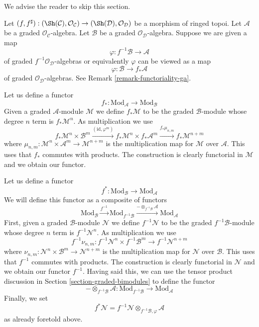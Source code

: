 \noindent
We advise the reader to skip this section.

\medskip\noindent
Let $(f, f^\sharp) : (\Sh(\mathcal{C}), \mathcal{O}_\mathcal{C})
\to (\Sh(\mathcal{D}), \mathcal{O}_\mathcal{D})$
be a morphism of ringed topoi. Let $\mathcal{A}$ be a
graded $\mathcal{O}_\mathcal{C}$-algebra. Let $\mathcal{B}$ be a
graded $\mathcal{O}_\mathcal{D}$-algebra.
Suppose we are given a map
$$
\varphi : f^{-1}\mathcal{B} \to \mathcal{A}
$$
of graded $f^{-1}\mathcal{O}_\mathcal{D}$-algebras or equivalently
$\varphi$ can be viewed as a map
$$
\varphi : \mathcal{B} \to f_*\mathcal{A}
$$
of graded $\mathcal{O}_\mathcal{D}$-algebras.
See Remark \ref{remark-functoriality-ga}.

\medskip\noindent
Let us define a functor
$$
f_* :
\text{Mod}_\mathcal{A}
\longrightarrow
\text{Mod}_\mathcal{B}
$$
Given a graded $\mathcal{A}$-module $\mathcal{M}$ we define
$f_*\mathcal{M}$ to be the graded $\mathcal{B}$-module
whose degree $n$ term is $f_*\mathcal{M}^n$. As multiplication
we use
$$
f_*\mathcal{M}^n \times \mathcal{B}^m
\xrightarrow{(\text{id}, \varphi^m)}
f_*\mathcal{M}^n \times f_*\mathcal{A}^m
\xrightarrow{f_*\mu_{n, m}}
f_*\mathcal{M}^{n + m}
$$
where $\mu_{n, m} : \mathcal{M}^n \times \mathcal{A}^m
\to \mathcal{M}^{n + m}$ is the multiplication map for $\mathcal{M}$
over $\mathcal{A}$. This uses that $f_*$ commutes with products.
The construction is clearly functorial in
$\mathcal{M}$ and we obtain our functor.

\medskip\noindent
Let us define a functor
$$
f^* :
\text{Mod}_\mathcal{B}
\longrightarrow
\text{Mod}_\mathcal{A}
$$
We will define this functor as a composite of functors
$$
\text{Mod}_\mathcal{B}
\xrightarrow{f^{-1}}
\text{Mod}_{f^{-1}\mathcal{B}}
\xrightarrow{ - \otimes_{f^{-1}\mathcal{B}} \mathcal{A}}
\text{Mod}_\mathcal{A}
$$
First, given a graded $\mathcal{B}$-module $\mathcal{N}$ we define
$f^{-1}\mathcal{N}$ to be the graded $f^{-1}\mathcal{B}$-module
whose degree $n$ term is $f^{-1}\mathcal{N}^n$. As multiplication
we use
$$
f^{-1}\nu_{n, m} :
f^{-1}\mathcal{N}^n \times f^{-1}\mathcal{B}^m
\longrightarrow
f^{-1}\mathcal{N}^{n + m}
$$
where $\nu_{n, m} : \mathcal{N}^n \times \mathcal{B}^m
\to \mathcal{N}^{n + m}$ is the multiplication map for $\mathcal{N}$
over $\mathcal{B}$. This uses that $f^{-1}$ commutes with products.
The construction is clearly functorial in
$\mathcal{N}$ and we obtain our functor $f^{-1}$.
Having said this, we can use the tensor
product discussion in Section \ref{section-graded-bimodules}
to define the functor
$$
- \otimes_{f^{-1}\mathcal{B}} \mathcal{A} :
\text{Mod}_{f^{-1}\mathcal{B}}
\longrightarrow
\text{Mod}_\mathcal{A}
$$
Finally, we set
$$
f^*\mathcal{N} =
f^{-1}\mathcal{N} \otimes_{f^{-1}\mathcal{B}, \varphi} \mathcal{A}
$$
as already foretold above.

